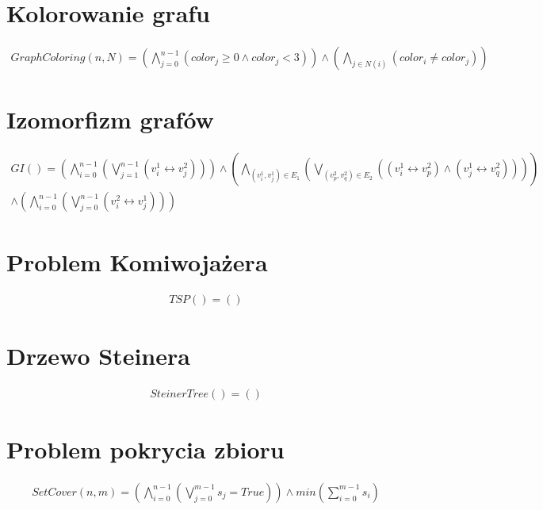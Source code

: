 \section{Kolorowanie grafu}

\begin{align*}
	GraphColoring(n, N) = \left( \bigwedge_{j=0}^{n-1} (color_j \geq 0 \land color_j < 3) \right) \land 
	\left( \bigwedge_{j \in N(i)} (color_i \neq color_j) \right)
\end{align*}

\section{Izomorfizm grafów}

\begin{align*}
	GI() = \left( \bigwedge_{i=0}^{n-1} \left( \bigvee_{j=1}^{n-1} (v_i^1 \leftrightarrow v_j^2) \right) \right) 
	\land \left( \bigwedge_{(v_i^1, v_j^1) \in E_1} \left( \bigvee_{(v_p^2, v_q^2) \in E_2} ((v_i^1 \leftrightarrow v_p^2) \land (v_j^1 \leftrightarrow v_q^2)) \right) \right) \\
	\land \left( \bigwedge_{i=0}^{n-1} \left( \bigvee_{j=0}^{n-1} (v_i^2 \leftrightarrow v_j^1) \right) \right)	
\end{align*}

\section{Problem Komiwojażera}

\begin{align*}
	TSP() = \left(  \right) 
\end{align*}

\section{Drzewo Steinera}

\begin{align*}
	SteinerTree() = \left(  \right) 
\end{align*}

\section{Problem pokrycia zbioru}

\begin{align*}
	SetCover(n, m) = \left( \bigwedge_{i=0}^{n-1} (\bigvee_{j=0}^{m-1} s_j = True) \right) \land 
	min \left( \sum_{i=0}^{m-1} s_i \right) 
\end{align*}

